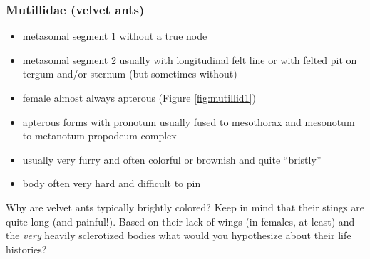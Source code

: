 \documentclass[letterpaper, 11pt]{article}
\begin{document}
\subsubsection{Mutillidae (velvet ants)}
\begin{itemize}
\item metasomal segment 1 without a true node
\item metasomal segment 2 usually with longitudinal felt line or with felted pit on tergum and/or sternum (but sometimes without)
\item female almost always apterous (Figure \ref{fig:mutillid1})
\item apterous forms with pronotum usually fused to mesothorax and mesonotum to metanotum-propodeum complex
\item usually very furry and often colorful or brownish and quite ``bristly'' 
\item body often very hard and difficult to pin
\end{itemize}
Why are velvet ants typically brightly colored? Keep in mind that their stings are quite long (and painful!). Based on their lack of wings (in females, at least) and the \textit{very} heavily sclerotized bodies what would you hypothesize about their life histories?
\end{document}

